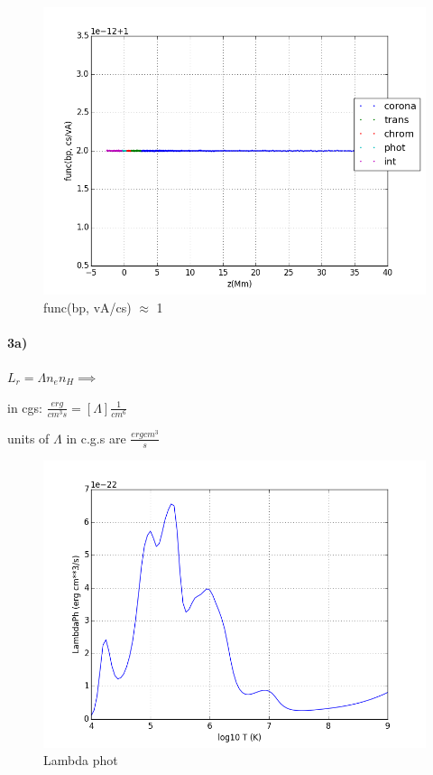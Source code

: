 \documentclass[10pt]{book}
\begin{document}
\begin{figure}[H]
 \centering
 \includegraphics[scale=0.5]{fromFile7.png}
 \caption{func(bp, vA/cs) $\approx$ 1}
\end{figure}




\paragraph{3a)}

$L_r = \Lambda n_e n_H \implies $

in cgs:  $\frac{erg}{cm^3 s} = [\Lambda] \frac{1}{cm^6}$

units of $\Lambda$ in c.g.s are $\frac{erg cm^3}{s}$ 

\begin{figure}[H]
 \centering
 \includegraphics[scale=0.5]{lambdaPh.png}
 \caption{ Lambda phot}
\end{figure}
\end{document}
